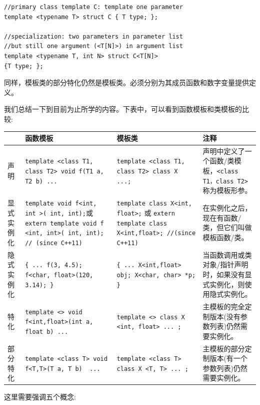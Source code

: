 \begin{lstlisting}[caption={}]
//primary class template C: template one parameter
template <typename T> struct C { T type; };

//specialization: two parameters in parameter list
//but still one argument (<T[N]>) in argument list
template <typename T, int N> struct C<T[N]>
{T type; };
\end{lstlisting}

同样，模板类的部分特化仍然是模板类。必须分别为其成员函数和数字变量提供定义。\par
我们总结一下到目前为止所学的内容。下表中，可以看到函数模板和类模板的比较:\par

\begin{table}[h]
	\begin{tabularx}{\textwidth}{|p{2cm}|X|X|X|}
		\hline
		& 函数模板  & 模板类  & 注释 \\ 
		\hline
		声明	& \texttt{template <class T1, class T2> void f(T1 a, T2 b){ ... }} & \texttt{template <class T1, class T2> class X { ...};} & 声明中定义了一个函数/类模板，\texttt{<class T1，class T2>}称为模板形参。 \\
		\hline
		显式实例化 & \texttt{template void f<int, int >( int, int);}或 \texttt{extern template	void f <int, int>( int, int); // (since C++11)} & \texttt{template class X<int, float>;} 或 \texttt{extern template	class X<int,float>; //(since C++11)} & 在实例化之后，现在有函数/类，但它们叫做模板函数/类。 \\
		\hline
		隐式实例化	& \texttt{\{
			... 
			f(3, 4.5);
			f<char,
			float>(120, 3.14);
		\}} & \texttt{\{
			... 
			X<int,float> obj; 
			X<char, char> *p;
		\}} & 当函数调用或类对象/指针声明时，如果没有显式实例化，则使用隐式实例化。 \\
		\hline
		特化	& \texttt{template <> void f<int,float>(int a, float b){ ... }} & \texttt{template <> class X <int, float>{ ... };} & 主模板的完全定制版本(没有参数列表)仍然需要实例化。 \\
		\hline
		部分特化	& \texttt{template <class T> void f<T,T>(T a, T b) { ... }} & \texttt{template <class T> class X <T, T>{	... };} & 主模板的部分定制版本(有一个参数列表)仍然需要实例化。 \\ 
		\hline
	\end{tabularx}
\end{table}

这里需要强调五个概念: \par

